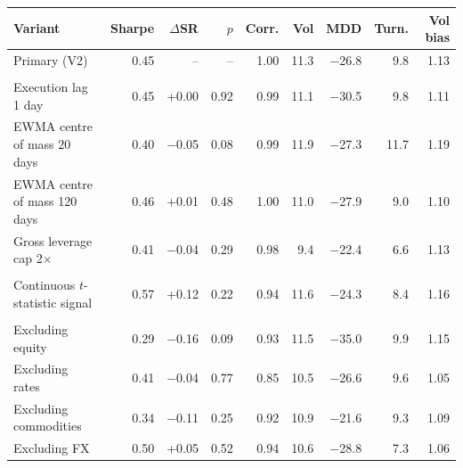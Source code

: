\begin{tabular}{lrrrrrrrr}
\toprule
Variant & Sharpe & $\Delta$SR & $p$ & Corr. & Vol & MDD & Turn. & Vol bias \\
\midrule
Primary (V2) & 0.45 & -- & -- & 1.00 & 11.3 & $-$26.8 & 9.8 & 1.13 \\
\addlinespace
\multicolumn{9}{l}{\textit{Implementation and estimation}} \\
Execution lag 1 day & 0.45 & +0.00 & 0.92 & 0.99 & 11.1 & $-$30.5 & 9.8 & 1.11 \\
EWMA centre of mass 20 days & 0.40 & $-$0.05 & 0.08 & 0.99 & 11.9 & $-$27.3 & 11.7 & 1.19 \\
EWMA centre of mass 120 days & 0.46 & +0.01 & 0.48 & 1.00 & 11.0 & $-$27.9 & 9.0 & 1.10 \\
Gross leverage cap 2$\times$ & 0.41 & $-$0.04 & 0.29 & 0.98 & 9.4 & $-$22.4 & 6.6 & 1.13 \\
\addlinespace
\multicolumn{9}{l}{\textit{Signal}} \\
Continuous $t$-statistic signal & 0.57 & +0.12 & 0.22 & 0.94 & 11.6 & $-$24.3 & 8.4 & 1.16 \\
\addlinespace
\multicolumn{9}{l}{\textit{Leave one asset class out}} \\
Excluding equity & 0.29 & $-$0.16 & 0.09 & 0.93 & 11.5 & $-$35.0 & 9.9 & 1.15 \\
Excluding rates & 0.41 & $-$0.04 & 0.77 & 0.85 & 10.5 & $-$26.6 & 9.6 & 1.05 \\
Excluding commodities & 0.34 & $-$0.11 & 0.25 & 0.92 & 10.9 & $-$21.6 & 9.3 & 1.09 \\
Excluding FX & 0.50 & +0.05 & 0.52 & 0.94 & 10.6 & $-$28.8 & 7.3 & 1.06 \\
\bottomrule
\end{tabular}
